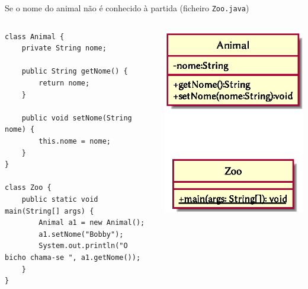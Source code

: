 \documentclass[portuguese, aspectratio=169, xcolor=table]{beamer}
\begin{document}
\begin{frame}[fragile]{Se o nome do animal não é conhecido à partida (ficheiro \texttt{Zoo.java})}
\begin{columns}
\begin{verbatim}
class Animal {
    private String nome;
    
    public String getNome() {
        return nome;
    }

    public void setNome(String nome) {
        this.nome = nome;
    }
}

class Zoo {
    public static void main(String[] args) {
        Animal a1 = new Animal();
        a1.setNome("Bobby");
        System.out.println("O bicho chama-se ", a1.getNome());
    }
}
\end{verbatim}
\begin{center}
\includegraphics[width=0.45\linewidth]{./uml_diagrams/class5}
\end{center}

\end{columns}
\end{frame}  
\end{document}
